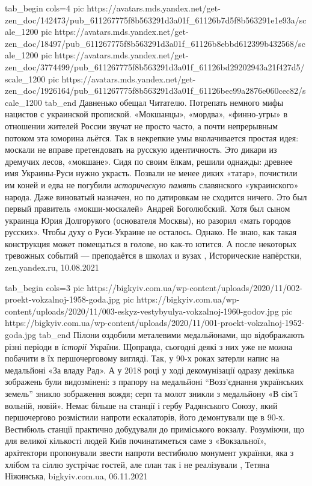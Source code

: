 \ifcmt
  tab_begin cols=4
     pic https://avatars.mds.yandex.net/get-zen_doc/142473/pub_611267775f8b563291d3a01f_61126b7d5f8b563291e1e93a/scale_1200
     pic https://avatars.mds.yandex.net/get-zen_doc/18497/pub_611267775f8b563291d3a01f_61126b8ebbd612399b432568/scale_1200
		 pic https://avatars.mds.yandex.net/get-zen_doc/3774499/pub_611267775f8b563291d3a01f_61126bd29202943a21f427d5/scale_1200
		 pic https://avatars.mds.yandex.net/get-zen_doc/1926164/pub_611267775f8b563291d3a01f_61126bec99a2876e060cec82/scale_1200
  tab_end
\fi
Давненько обещал Читателю. Потрепать немного мифы нацистов с украинской
пропиской. «Мокшанцы», «мордва», «финно-угры» в отношении жителей России звучат
не просто часто, а почти непрерывным потоком эта юморина льётся. Так в
некрепкие умы вколачивается простая идея: москали не вправе претендовать на
русскую идентичность. Это дикари из дремучих лесов, «мокшане».  Сидя по своим
ёлкам, решили однажды: древнее имя Украины-Руси нужно украсть.  Позвали не
менее диких «татар», почистили им коней и едва не погубили \emph{историческую
память} славянского «украинского» народа.  Даже виноватый назначен, но по
датировкам не сходится ничего. Это был первый правитель «мокши-москалей» Андрей
Боголюбский. Хотя был сыном украинца Юрия Долгорукого (основателя Москвы), но
разорил «мать городов русских». Чтобы духу о Руси-Украине не осталось. Однако.
Не знаю, как такая конструкция может помещаться в голове, но как-то ютится. А
после некоторых тревожных событий — преподаётся в школах и вузах
, 
Исторические напёрстки, zen.yandex.ru, 10.08.2021

\ifcmt
  tab_begin cols=3
     pic https://bigkyiv.com.ua/wp-content/uploads/2020/11/002-proekt-vokzalnoj-1958-goda.jpg
     pic https://bigkyiv.com.ua/wp-content/uploads/2020/11/003-eskyz-vestybyulya-vokzalnoj-1960-godov.jpg
		 pic https://bigkyiv.com.ua/wp-content/uploads/2020/11/001-proekt-vokzalnoj-1952-goda.jpg
  tab_end
\fi
Пілони оздобили металевими медальйонами, що відображають різні періоди в
\emph{історії} України. Щоправда, сьогодні деякі з них уже не можна побачити в їх
першочерговому вигляді.  Так, у 90-х роках затерли напис на медальйоні «За
владу Рад». А у 2018 році у ході декомунізації одразу декілька зображень були
видозмінені: з прапору на медальйоні \enquote{Возз’єднання українських земель} зникло
зображення вождя; серп та молот зникли з медальйону «В сім’ї вольній, новій».
Немає більше на станції і гербу Радянського Союзу, який першочергово розмістили
напроти ескалаторів, його демонтували ще в 90-х. Вестибюль станції практично
добудували до приміського вокзалу. Розуміючи, що для великої кількості людей
Київ починатиметься саме з «Вокзальної», архітектори пропонували звести напроти
вестибюлю монумент українки, яка з хлібом та сіллю зустрічає гостей, але план
так і не реалізували
, 
Тетяна Ніжинська, bigkyiv.com.ua, 06.11.2021

